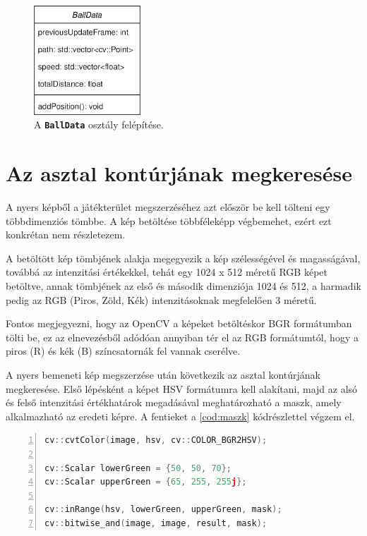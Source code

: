 \begin{figure}[!ht]
    \centering
    \includegraphics[width=40mm, keepaspectratio]{figures/balldata_class.png}
    \caption{A \textbf{\lstinline{BallData}} osztály felépítése.}
    \label{fig:balldata_class}
\end{figure}

\section{Az asztal kontúrjának megkeresése}
\label{section:megv_asztal_kontur}
A nyers képből a játékterület megszerzéséhez azt először be kell tölteni egy többdimenziós tömbbe. A kép betöltése többféleképp végbemehet, ezért ezt konkrétan nem részletezem.
\par A betöltött kép tömbjének alakja megegyezik a kép szélességével és magasságával, továbbá az intenzitási értékekkel, tehát egy 1024 x 512 méretű RGB képet betöltve, annak tömbjének az első és második dimenziója 1024 és 512, a harmadik pedig az RGB (Piros, Zöld, Kék) intenzitásoknak megfelelően 3 méretű.
\par Fontos megjegyezni, hogy az OpenCV a képeket betöltéskor BGR formátumban tölti be, ez az elnevezésből adódóan annyiban tér el az RGB formátumtól, hogy a piros (R) és kék (B) színcsatornák fel vannak cserélve.
\par A nyers bemeneti kép megszerzése után következik az asztal kontúrjának megkeresése. Első lépésként a képet HSV formátumra kell alakítani, majd az alsó és felső intenzitási értékhatárok megadásával meghatározható a maszk, amely alkalmazható az eredeti képre.
\newline A fentieket a \ref{cod:maszk} kódrészlettel végzem el.


\begin{codewrapper}
\begin{lstlisting}[language=C++, numbers=left, caption={A játékterület maszkolása.}, label={cod:maszk}]
cv::cvtColor(image, hsv, cv::COLOR_BGR2HSV);

cv::Scalar lowerGreen = {50, 50, 70};
cv::Scalar upperGreen = {65, 255, 255j};

cv::inRange(hsv, lowerGreen, upperGreen, mask);
cv::bitwise_and(image, image, result, mask);
\end{lstlisting}
\end{codewrapper}

